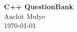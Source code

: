 \begin{titlepage}
    \thispagestyle{empty} %
    \centering
    \vfill                %
    \begin{center}
        {\Huge \textbf{C++ QuestionBank}}\\
        \vspace{1cm}
        {\Large Anchit Mulye}\\
        \vspace{0.5cm}
        {\Large \today}
    \end{center}
    \vfill                %
\end{titlepage}